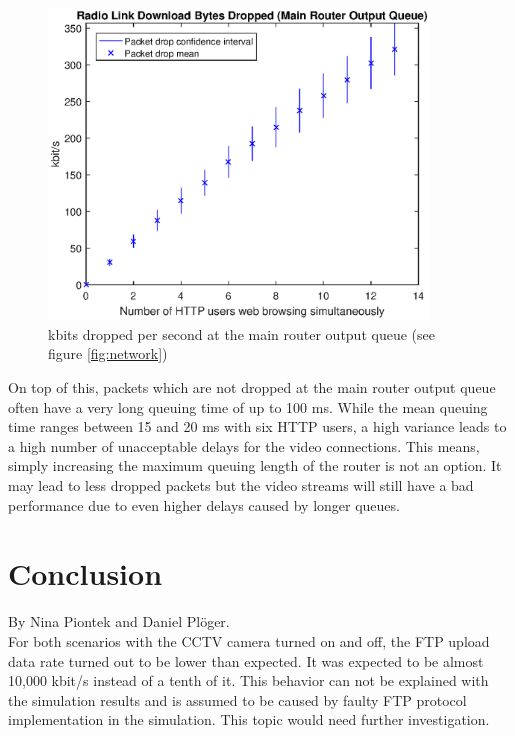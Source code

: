 \documentclass[a4paper,10pt]{book}\usepackage{graphicx}
\begin{document}
\begin{figure}[!ht]
  \begin{center}
    \includegraphics[width=0.9\textwidth]{on_main_router_drops.eps}
    \caption{kbits dropped per second at the main router output queue (see figure \ref{fig:network})}
    \label{fig:onMainRouterDrops}
    \end{center}
\end{figure}

On top of this, packets which are not dropped at the main router output queue often have a very long queuing time of up to 100 ms. While the mean queuing time ranges between 15 and 20 ms with six HTTP users, a high variance leads to a high number of unacceptable delays for the video connections. This means, simply increasing the maximum queuing length of the router is not an option. It may lead to less dropped packets but the video streams will still have a bad performance due to even higher delays caused by longer queues.

\chapter{Conclusion}
\label{chapter_conclusion}
By Nina Piontek and Daniel Plöger. \\

For both scenarios with the CCTV camera turned on and off, the FTP upload data rate turned out to be lower than expected. It was expected to be almost 10,000 kbit/s instead of a tenth of it. This behavior can not be explained with the simulation results and is assumed to be caused by faulty FTP protocol implementation in the simulation. This topic would need further investigation.
\end{document}
